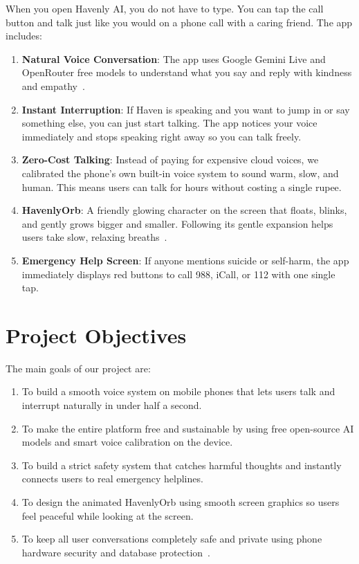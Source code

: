 When you open Havenly AI, you do not have to type. You can tap the call button and talk just like you would on a phone call with a caring friend. The app includes:
\begin{enumerate}
    \item \textbf{Natural Voice Conversation}: The app uses Google Gemini Live and OpenRouter free models to understand what you say and reply with kindness and empathy~\cite{google2024multimodallive}.
    \item \textbf{Instant Interruption}: If Haven is speaking and you want to jump in or say something else, you can just start talking. The app notices your voice immediately and stops speaking right away so you can talk freely.
    \item \textbf{Zero-Cost Talking}: Instead of paying for expensive cloud voices, we calibrated the phone's own built-in voice system to sound warm, slow, and human. This means users can talk for hours without costing a single rupee.
    \item \textbf{HavenlyOrb}: A friendly glowing character on the screen that floats, blinks, and gently grows bigger and smaller. Following its gentle expansion helps users take slow, relaxing breaths~\cite{balban2023respiration}.
    \item \textbf{Emergency Help Screen}: If anyone mentions suicide or self-harm, the app immediately displays red buttons to call 988, iCall, or 112 with one single tap.
\end{enumerate}

\section{Project Objectives}
\label{sec:intro_objectives}

The main goals of our project are:
\begin{enumerate}
    \item To build a smooth voice system on mobile phones that lets users talk and interrupt naturally in under half a second.
    \item To make the entire platform free and sustainable by using free open-source AI models and smart voice calibration on the device.
    \item To build a strict safety system that catches harmful thoughts and instantly connects users to real emergency helplines.
    \item To design the animated HavenlyOrb using smooth screen graphics so users feel peaceful while looking at the screen.
    \item To keep all user conversations completely safe and private using phone hardware security and database protection~\cite{supabase2024rls}.
\end{enumerate}

